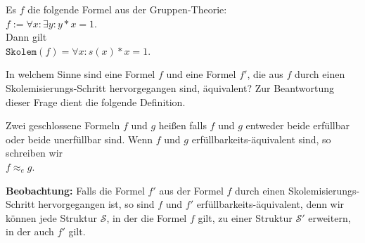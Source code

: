 \example
Es $f$ die folgende Formel aus der Gruppen-Theorie:
\\[0.2cm]
\hspace*{1.3cm}
$f := \forall x: \exists y: y * x = 1$. 
\\[0.2cm]
Dann gilt
\\[0.2cm]
\hspace*{1.3cm}
$\mathtt{Skolem}(f) = \forall x : s(x) * x = 1$.  \eox

\noindent
In welchem Sinne sind eine Formel $f$ und eine Formel $f'$, die aus $f$ durch einen 
Skolem\-isierungs-Schritt hervorgegangen sind, äquivalent?  Zur Beantwortung dieser Frage
dient die folgende Definition. 

\begin{Definition} \hspace*{1.1cm} 
   Zwei geschlossene Formeln $f$ und $g$ heißen 
   falls $f$ und $g$ entweder beide erfüllbar oder beide unerfüllbar sind.
   Wenn $f$ und $g$ erfüllbarkeits-äquivalent sind, so schreiben wir \\[0.2cm]
   \hspace*{1.3cm} $f \approx_e g$.
\eox
\end{Definition}

\noindent
\textbf{Beobachtung:}
Falls die Formel $f'$ aus der Formel $f$ durch einen Skolemisierungs-Schritt 
hervorgegangen ist, so sind $f$ und $f'$ erfüllbarkeits-äquivalent, denn wir können jede Struktur
$\mathcal{S}$, in der die Formel $f$ gilt, zu einer Struktur $\mathcal{S}'$ erweitern, in der auch $f'$ gilt.
\eox

